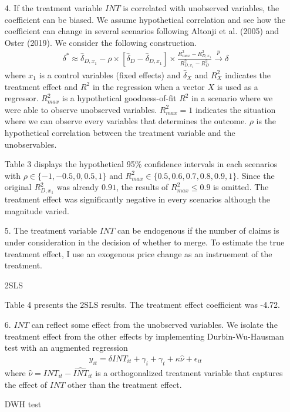 \documentclass[12pt]{article}
\begin{document}
\begin{itemize}
	    	    		
		\item[4.] If the treatment variable $INT$ is correlated with unobserved variables, the coefficient can be biased. We assume hypothetical correlation and see how the coefficient can change in several scenarios following Altonji et al. (2005) and Oster (2019). We consider the following construction.
		\begin{eqnarray*}
			\delta^* \approx \hat{\delta}_{D,x_1} - \rho \times [\hat{\delta}_D - \hat{\delta}_{D,x_1}] \times \frac{R_{max}^2 - R_{D,x_1}^2}{R_{D,x_1}^2 - R_D^2} \xrightarrow{p} \delta
		\end{eqnarray*}
	where $x_1$ is a control variables (fixed effects) and $\hat{\delta}_X$ and $R^2_X$ indicates the treatment effect and $R^2$ in the regression when a vector $X$ is used as a regressor. $R_{max}^2$ is a hypothetical goodness-of-fit $R^2$ in a scenario where we were able to observe unobserved variables. $R_{max}^2 =1$ indicates the situation where we can observe every variables that determines the outcome. $\rho$ is the hypothetical correlation between the treatment variable and the unobservables.
	
		\begin{tiny}
    	    
		\end{tiny}
    
    	Table 3 displays the hypothetical 95\% confidence intervals in each scenarios with $\rho \in \{-1, -0.5, 0, 0.5, 1\}$ and $R_{max}^2 \in \{0.5, 0.6, 0.7, 0.8, 0.9, 1\}$. Since the original $R^2_{D,x_1}$ was already $0.91$, the results of $R_{max}^2 \le 0.9$ is omitted. The treatment effect was significantly negative in every scenarios although the magnitude varied.
    	
    	\item[5.] The treatment variable $INT$ can be endogenous if the number of claims is under consideration in the decision of whether to merge. To estimate the true treatment effect, I use an exogenous price change as an instruement of the treatment.
	\begin{table}[h]
    		
    		\caption{2SLS}
    	\end{table}
    
        Table 4 presents the 2SLS results. The treatment effect coefficient was -4.72.
				
		\item[6.] $INT$ can reflect some effect from the unobserved variables. We isolate the treatment effect from the other effects by implementing Durbin-Wu-Hausman test with an augmented regression
		\begin{eqnarray*}
			y_{it} = \delta INT_{it} + \gamma_i + \gamma_t + \kappa \hat{\nu} + \epsilon_{it}
		\end{eqnarray*}
	where $\hat{\nu} = INT_{it} - \hat{INT}_{it}$ is a orthogonalized treatment variable that captures the effect of $INT$ other than the treatment effect.
		\begin{table} [ht]
		
		\caption{DWH test}
	\end{table}


\end{itemize}
\end{document}
